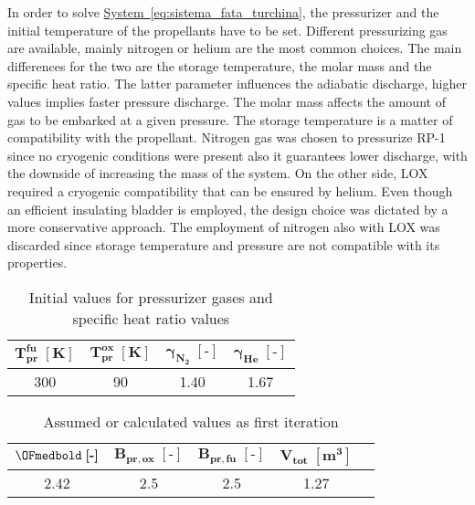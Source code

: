 In order to solve \hyperref[eq:sistema_fata_turchina]{System~\ref*{eq:sistema_fata_turchina}}, the pressurizer and the initial temperature of the propellants have to be set. Different pressurizing gas are available, mainly nitrogen or helium are the most common choices.
The main differences for the two are the storage temperature, the molar mass and the specific heat ratio. The latter parameter influences the adiabatic discharge, higher values implies faster pressure discharge.
The molar mass affects the amount of gas to be embarked at a given pressure. The storage temperature is a matter of compatibility with the propellant.
Nitrogen gas was chosen to pressurize RP-1 since no cryogenic conditions were present also it guarantees lower discharge, with the downside of increasing the mass of the system.
On the other side, LOX required a cryogenic compatibility that can be ensured by helium. Even though an efficient insulating bladder is employed, the design choice was dictated by a more conservative approach.
The employment of nitrogen also with LOX was discarded since storage temperature and pressure are not compatible with its properties\cite{nist}.
\begin{table}[H]
    \renewcommand{\arraystretch}{1.4}
    \centering
    \begin{tabular}{|c|c|c|c|}
        \hline
        $\boldsymbol{T_{pr}^{fu}} \; [\textbf{K}]$ & $\boldsymbol{T_{pr}^{ox} \; [\textbf{K}]}$ & $\boldsymbol{\gamma_{N_2} \; [\textbf{-}]}$  & $\boldsymbol{\gamma_{He} \; [\textbf{-}]}$ \\
        \hline
        \hline
        300 & 90 & 1.40 & 1.67 \\
        \hline
    \end{tabular}
    \caption{Initial values for pressurizer gases and specific heat ratio values}
    \label{table:press_value}
\end{table}

\begin{table}[H]
    \renewcommand{\arraystretch}{1.4}
    \centering
    \begin{tabular}{|c|c|c|c|c|}
        \hline
        $\OFmedbold \; \boldsymbol{[\textbf{-}]}$ & $\boldsymbol{B_{pr,ox} \; [\textbf{-}]}$ & $\boldsymbol{B_{pr,fu} \; [\textbf{-}]}$  & $\boldsymbol{V_{tot} \; [\textbf{m}^3]}$ \\
        \hline
        \hline
        2.42 & 2.5 & 2.5 & 1.27 \\
        \hline
    \end{tabular}
    \caption{Assumed or calculated values as first iteration}
    \label{table:fata_turchina_valori_assunti}
\end{table}

